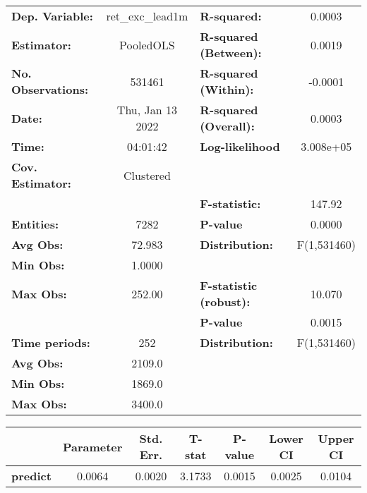 \begin{center}
\begin{tabular}{lclc}
\toprule
\textbf{Dep. Variable:}    &  ret\_exc\_lead1m  & \textbf{  R-squared:         }   &      0.0003      \\
\textbf{Estimator:}        &     PooledOLS      & \textbf{  R-squared (Between):}  &      0.0019      \\
\textbf{No. Observations:} &       531461       & \textbf{  R-squared (Within):}   &     -0.0001      \\
\textbf{Date:}             &  Thu, Jan 13 2022  & \textbf{  R-squared (Overall):}  &      0.0003      \\
\textbf{Time:}             &      04:01:42      & \textbf{  Log-likelihood     }   &    3.008e+05     \\
\textbf{Cov. Estimator:}   &     Clustered      & \textbf{                     }   &                  \\
\textbf{}                  &                    & \textbf{  F-statistic:       }   &      147.92      \\
\textbf{Entities:}         &        7282        & \textbf{  P-value            }   &      0.0000      \\
\textbf{Avg Obs:}          &       72.983       & \textbf{  Distribution:      }   &   F(1,531460)    \\
\textbf{Min Obs:}          &       1.0000       & \textbf{                     }   &                  \\
\textbf{Max Obs:}          &       252.00       & \textbf{  F-statistic (robust):} &      10.070      \\
\textbf{}                  &                    & \textbf{  P-value            }   &      0.0015      \\
\textbf{Time periods:}     &        252         & \textbf{  Distribution:      }   &   F(1,531460)    \\
\textbf{Avg Obs:}          &       2109.0       & \textbf{                     }   &                  \\
\textbf{Min Obs:}          &       1869.0       & \textbf{                     }   &                  \\
\textbf{Max Obs:}          &       3400.0       & \textbf{                     }   &                  \\
\bottomrule
\end{tabular}
\begin{tabular}{lcccccc}
                 & \textbf{Parameter} & \textbf{Std. Err.} & \textbf{T-stat} & \textbf{P-value} & \textbf{Lower CI} & \textbf{Upper CI}  \\
\midrule
\textbf{predict} &       0.0064       &       0.0020       &      3.1733     &      0.0015      &       0.0025      &       0.0104       \\
\bottomrule
\end{tabular}
\end{center}

